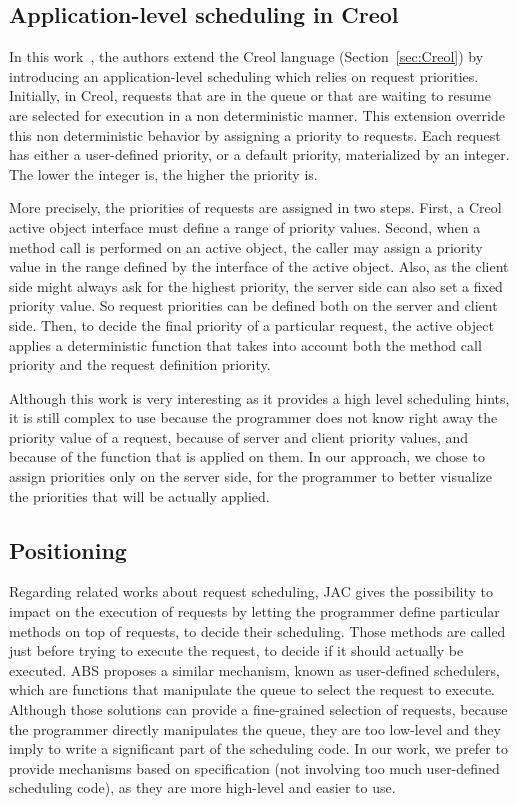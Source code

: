 \documentclass[11pt]{report}
\begin{document}
\subsection{Application-level scheduling in Creol}
In this work~\cite{ref:Nobakht:2012:PDA:2245276.2232086}, the authors extend the Creol  language (Section~\ref{sec:Creol}) by introducing an application-level scheduling which relies on request priorities. Initially, in Creol, requests that are in the queue or that are waiting to resume are selected for execution in a non deterministic manner. This extension override this non deterministic behavior by assigning a priority to requests. Each request has either a user-defined priority, or a default priority, materialized by an integer. The lower the integer is, the higher the priority is. 

More precisely, the priorities of requests are assigned in two steps. First, a Creol active object interface must define a range of priority values. Second, when a method call is performed on an active object, the caller may assign a priority value in the range defined by the interface of the active object. Also, as the client side might always ask for the highest priority, the server side can also set a fixed priority value. So request priorities can be defined both on the server and client side. Then, to decide the final priority of a particular request, the active object applies a deterministic function that takes into account both the method call priority and the request definition priority.

Although this work is very interesting as it provides a high level scheduling hints, it is still complex to use because the programmer does not know right away the priority value of a request, because of server and client priority values, and because of the function that is applied on them. In our approach, we chose to assign priorities only on the server side, for the programmer to better visualize the priorities that will be actually applied. 


\subsection{Positioning}
Regarding related works about request scheduling, JAC gives the possibility to impact on the execution of requests by letting the programmer define particular methods on top of requests, to decide their scheduling. Those methods are called just before trying to execute the request, to decide if it should actually be executed. ABS proposes a similar mechanism, known as user-defined schedulers, which are functions that manipulate the queue to select the request to execute. Although those solutions can provide a fine-grained selection of requests, because the programmer directly manipulates the queue, they are too low-level and they imply to write a significant part of the scheduling code. In our work, we prefer to provide mechanisms based on specification (not involving too much user-defined scheduling code), as they are more high-level and easier to use. 
\end{document}
